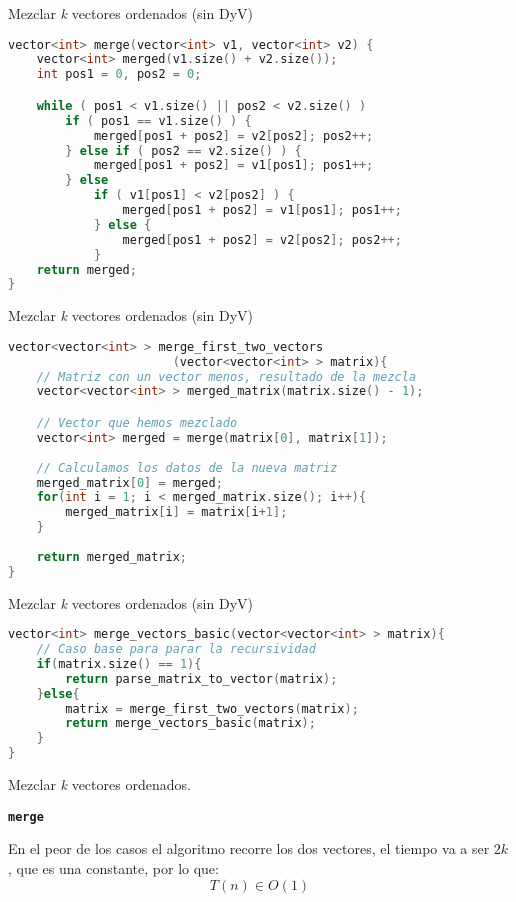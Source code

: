 \documentclass[10pt, xcolor=table]{beamer}
\begin{document}
\begin{frame}[fragile]{Mezclar \textit{k} vectores ordenados (sin DyV)}
\begin{lstlisting}[language=C]
vector<int> merge(vector<int> v1, vector<int> v2) {
	vector<int> merged(v1.size() + v2.size());
	int pos1 = 0, pos2 = 0;

	while ( pos1 < v1.size() || pos2 < v2.size() )
		if ( pos1 == v1.size() ) {
			merged[pos1 + pos2] = v2[pos2]; pos2++;
		} else if ( pos2 == v2.size() ) {
			merged[pos1 + pos2] = v1[pos1];	pos1++;
		} else
			if ( v1[pos1] < v2[pos2] ) {
				merged[pos1 + pos2] = v1[pos1]; pos1++;
			} else {
				merged[pos1 + pos2] = v2[pos2]; pos2++;
			}
	return merged;
}
\end{lstlisting}
\end{frame}

\begin{frame}[fragile]{Mezclar \textit{k} vectores ordenados (sin DyV)}
\begin{lstlisting}[language=C]
vector<vector<int> > merge_first_two_vectors
                       (vector<vector<int> > matrix){
	// Matriz con un vector menos, resultado de la mezcla
	vector<vector<int> > merged_matrix(matrix.size() - 1);

	// Vector que hemos mezclado
	vector<int> merged = merge(matrix[0], matrix[1]);
	
	// Calculamos los datos de la nueva matriz
	merged_matrix[0] = merged;
	for(int i = 1; i < merged_matrix.size(); i++){
		merged_matrix[i] = matrix[i+1];
	}
	
	return merged_matrix;
}
\end{lstlisting}
\end{frame}

\begin{frame}[fragile]{Mezclar \textit{k} vectores ordenados (sin DyV)}
\begin{lstlisting}[language=C]
vector<int> merge_vectors_basic(vector<vector<int> > matrix){
	// Caso base para parar la recursividad
	if(matrix.size() == 1){
		return parse_matrix_to_vector(matrix);	
	}else{
		matrix = merge_first_two_vectors(matrix);
		return merge_vectors_basic(matrix);
	}
}

\end{lstlisting}
\end{frame}

\begin{frame}[fragile]{Mezclar \textit{k} vectores ordenados. }
\begin{center}
	\textbf{\large{\texttt{merge}}}
\end{center}

En el peor de los casos el algoritmo recorre los dos vectores, el tiempo va a ser $2k$, que es una constante, por lo que: $$T(n) \in O(1)$$
\end{frame}
\end{document}
